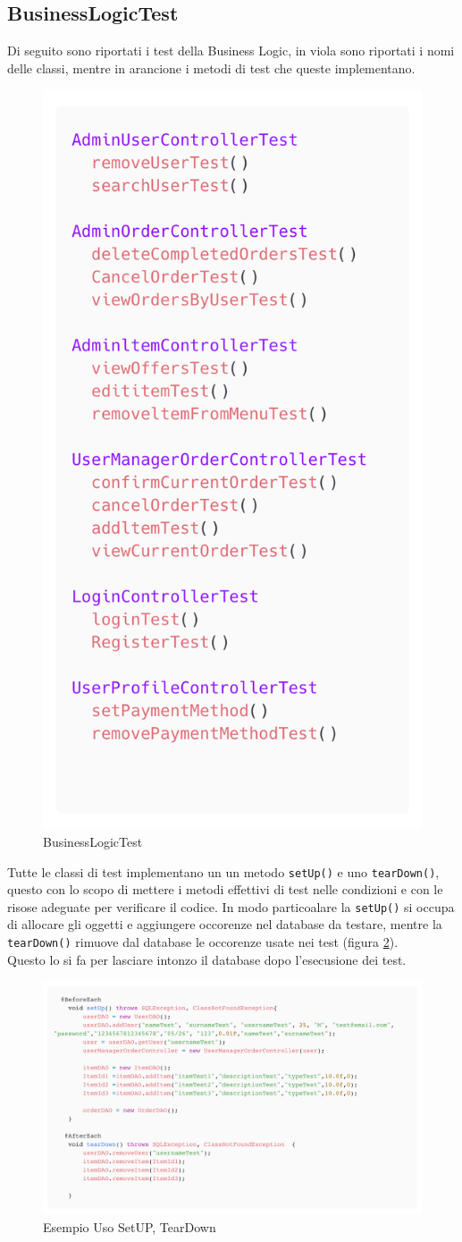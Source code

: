 \documentclass{article}
\begin{document}
\subsection{BusinessLogicTest}
Di seguito sono riportati i test della Business Logic, in viola sono riportati i nomi delle classi, mentre in arancione i metodi di test che queste implementano.


\begin{figure}[!h]
    \centering
    \includegraphics[width=0.4\linewidth]{imgs/BusinessLogicTest.png}
    \caption{BusinessLogicTest}
    \label{BusinessLogicTest}
\end{figure}

Tutte le classi di test implementano un un metodo \texttt{setUp()} e uno \texttt{tearDown()}, questo con lo scopo di mettere i metodi effettivi di test nelle condizioni e con le risose adeguate per verificare il codice. In modo particoalare la \texttt{setUp()} si occupa di allocare gli oggetti e aggiungere occorenze nel database da testare, mentre la \texttt{tearDown()} rimuove dal database le occorenze usate nei test (figura \ref{SetUP-TearDown}).\\ Questo lo si fa per lasciare intonzo il database dopo l'esecusione dei test.


\begin{figure}[H]
    \centering
    \includegraphics[width=1.0\linewidth]{imgs/snippets/SetUp-TearDown.png}
    \caption{Esempio Uso SetUP, TearDown}
    \label{SetUP-TearDown}
\end{figure}
\end{document}
